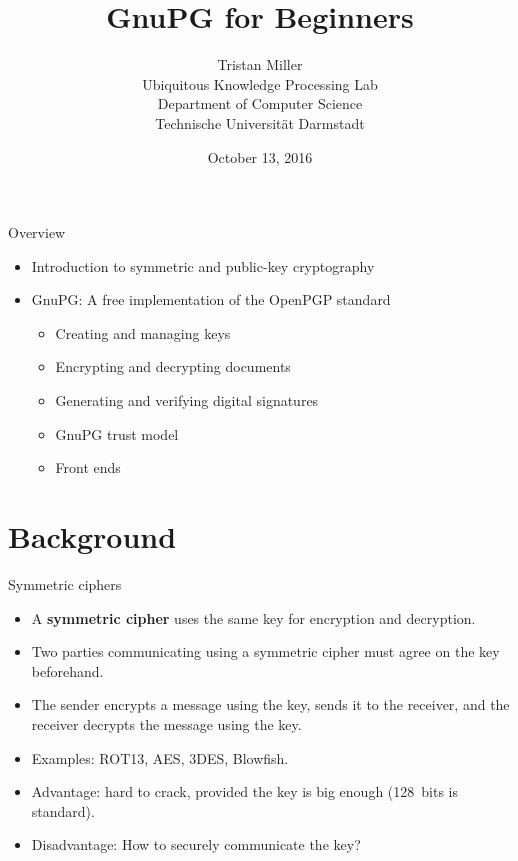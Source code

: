\documentclass[
mode=present,
paper=smartboard,
size=20pt,
]{powerdot}
\title{GnuPG for Beginners}
\author{%
  Tristan Miller\\
  Ubiquitous Knowledge Processing Lab\\
  Department of Computer Science\\
  Technische Universit\"at Darmstadt
}
\date{October 13, 2016}
\begin{document}
\maketitle

\begin{slide}[toc=]{Overview}
  \begin{itemize}
  \item Introduction to symmetric and public-key cryptography
  \item GnuPG: A free implementation of the OpenPGP standard
    \begin{itemize}
    \item Creating and managing keys
    \item Encrypting and decrypting documents
    \item Generating and verifying digital signatures
    \item GnuPG trust model
    \item Front ends
    \end{itemize}
  \end{itemize}
\end{slide}

\section{Background}
\begin{slide}{Symmetric ciphers}
  \begin{itemize}
  \item A \textbf{symmetric cipher} uses the same key for encryption
    and decryption.
  \item Two parties communicating using a symmetric cipher must agree
    on the key beforehand.
  \item The sender encrypts a message using the key,
    sends it to the receiver, and the receiver decrypts the message
    using the key.
  \item Examples: ROT13, AES, 3DES, Blowfish.
  \item Advantage: hard to crack, provided the key is big enough
    (128~bits is standard).
  \item Disadvantage: How to securely communicate the key?
  \end{itemize}
\end{slide}
\end{document}
